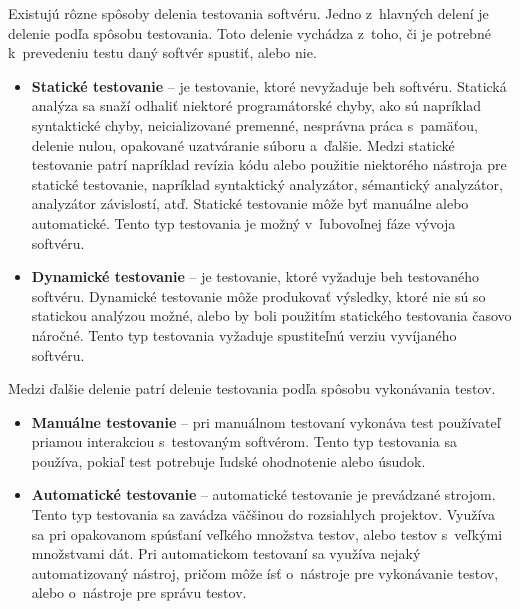 Existujú rôzne spôsoby delenia testovania softvéru. 
Jedno z~hlavných delení je delenie podľa spôsobu testovania.
Toto delenie vychádza z~toho, či je potrebné k~prevedeniu 
testu daný softvér spustiť, alebo nie.
\begin{itemize}
\item \textbf{Statické testovanie} --
je testovanie, ktoré nevyžaduje beh softvéru. 
Statická analýza sa snaží odhaliť niektoré programátorské chyby, 
ako sú napríklad syntaktické chyby, neicializované premenné, 
nesprávna práca s~pamäťou, delenie nulou, opakované uzatváranie súboru 
a~ďalšie. 
Medzi statické testovanie patrí napríklad revízia kódu alebo použitie 
niektorého nástroja pre statické testovanie, napríklad 
syntaktický analyzátor, sémantický analyzátor, analyzátor závislostí, atď. 
Statické testovanie môže byť manuálne alebo automatické. 
Tento typ testovania je možný v~ľubovoľnej fáze vývoja softvéru.

\item \textbf{Dynamické testovanie} -- 
je testovanie, ktoré vyžaduje beh testovaného softvéru. 
Dynamické testovanie môže produkovať výsledky, ktoré nie sú so statickou 
analýzou možné, alebo by boli použitím statického testovania časovo náročné. 
Tento typ testovania vyžaduje spustiteľnú verziu vyvíjaného softvéru.
\end{itemize}


\noindent Medzi ďalšie delenie patrí delenie testovania podľa spôsobu 
vykonávania testov.
\begin{itemize}
\item \textbf{Manuálne testovanie} --
pri manuálnom testovaní vykonáva test používateľ priamou interakciou 
s~testovaným softvérom. Tento typ testovania sa používa, pokiaľ test 
potrebuje ľudské ohodnotenie alebo úsudok.

\item \textbf{Automatické testovanie} --
automatické testovanie je prevádzané strojom.
Tento typ testovania sa zavádza väčšinou do rozsiahlych projektov.
Využíva sa pri opakovanom spúsťaní veľkého množstva testov, alebo testov
s~veľkými množstvami dát. Pri automatickom testovaní sa využíva nejaký 
automatizovaný nástroj, pričom môže ísť o~nástroje 
pre vykonávanie testov, alebo o~nástroje pre správu testov.
\end{itemize}


